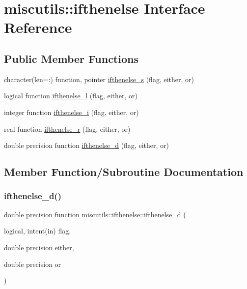 \hypertarget{interfacemiscutils_1_1ifthenelse}{}\section{miscutils\+:\+:ifthenelse Interface Reference}
\label{interfacemiscutils_1_1ifthenelse}
\subsection*{Public Member Functions}
\begin{DoxyCompactItemize}
\item 
character(len=\+:) function, pointer \mbox{\hyperlink{interfacemiscutils_1_1ifthenelse_a3491a4415c681f89c9a6a181a12d21c5}{ifthenelse\+\_\+s}} (flag, either, or)
\item 
logical function \mbox{\hyperlink{interfacemiscutils_1_1ifthenelse_aa8a41eaf1650f63c8fbfaaddfdb4ab53}{ifthenelse\+\_\+l}} (flag, either, or)
\item 
integer function \mbox{\hyperlink{interfacemiscutils_1_1ifthenelse_a0bc2adf139e500a22c09641d4bb8e682}{ifthenelse\+\_\+i}} (flag, either, or)
\item 
real function \mbox{\hyperlink{interfacemiscutils_1_1ifthenelse_a33bb5263b33632496f703ac0e87f442e}{ifthenelse\+\_\+r}} (flag, either, or)
\item 
double precision function \mbox{\hyperlink{interfacemiscutils_1_1ifthenelse_a6e670e8b652bb1ded7a8e83be0a7eb62}{ifthenelse\+\_\+d}} (flag, either, or)
\end{DoxyCompactItemize}


\subsection{Member Function/\+Subroutine Documentation}
\mbox{\label{interfacemiscutils_1_1ifthenelse_a6e670e8b652bb1ded7a8e83be0a7eb62}} 
\subsubsection{\texorpdfstring{ifthenelse\+\_\+d()}{ifthenelse\_d()}}
{\footnotesize\ttfamily double precision function miscutils\+::ifthenelse\+::ifthenelse\+\_\+d (\begin{DoxyParamCaption}\item[{logical, intent(in)}]{flag,  }\item[{double precision}]{either,  }\item[{double precision}]{or }\end{DoxyParamCaption})}

